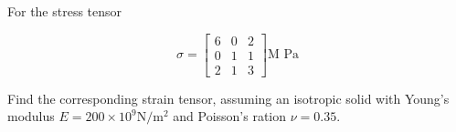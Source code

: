 % 
% 
% 
% 
% 
% 
% 
% 
% 
% 
% 
% 

\begin{Exercise}[title={Strain tensor from stress tensor}, label={problem:continuumProblemSet1:q1}]
For the stress tensor

\begin{equation}\label{eqn:continuumProblemSet1:10}
\sigma =
\begin{bmatrix}
6 & 0 & 2 \\
0 & 1 & 1 \\
2 & 1 & 3
\end{bmatrix}
\text{M Pa}
\end{equation}

Find the corresponding strain tensor, assuming an isotropic solid with Young's modulus $E = 200 \times 10^9 \text{N}/\text{m}^2$ and Poisson's ration $\nu = 0.35$.
\end{Exercise}

